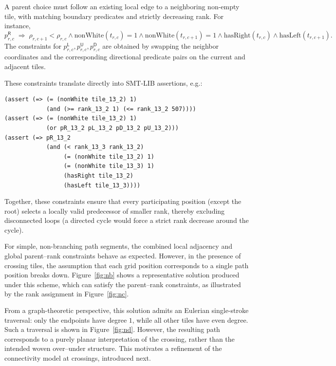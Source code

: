 \documentclass[acmsmall,screen,nonacm]{acmart}
\newcommand{\kind}[1]{\mathsf{#1}}
\begin{document}
A parent choice must follow an existing local edge to a neighboring
non-empty tile, with matching boundary predicates and strictly
decreasing rank. For instance,
\[
p^\kind{R}_{r,c}\;\Rightarrow\; \rho_{r,c+1}<\rho_{r,c} \wedge
\mathrm{nonWhite}(t_{r,c}) = 1 \wedge \mathrm{nonWhite}(t_{r,c+1})=1
\wedge \mathrm{hasRight}(t_{r,c}) \wedge \mathrm{hasLeft}(t_{r,c+1}) .
\]
The constraints for \(p^\kind{L}_{r,c}, p^\kind{U}_{r,c}, p^\kind{D}_{r,c}\) are
obtained by swapping the neighbor coordinates and the corresponding
directional predicate pairs on the current and adjacent tiles.

These constraints translate directly into SMT-LIB assertions, e.g.:
\begin{tcolorbox}[smtsimple]
\begin{verbatim}
(assert (=> (= (nonWhite tile_13_2) 1)
            (and (>= rank_13_2 1) (<= rank_13_2 507))))
(assert (=> (= (nonWhite tile_13_2) 1)
            (or pR_13_2 pL_13_2 pD_13_2 pU_13_2)))
(assert (=> pR_13_2
            (and (< rank_13_3 rank_13_2)
                 (= (nonWhite tile_13_2) 1)
                 (= (nonWhite tile_13_3) 1)
                 (hasRight tile_13_2)
                 (hasLeft tile_13_3))))
\end{verbatim}
\end{tcolorbox}

Together, these constraints ensure that every participating position
(except the root) selects a locally valid predecessor of smaller rank,
thereby excluding disconnected loops (a directed cycle would force a
strict rank decrease around the cycle).

For simple, non-branching path segments, the combined local adjacency
and global parent--rank constraints behave as expected. However, in
the presence of crossing tiles, the assumption that each grid position
corresponds to a single path position breaks down. Figure~\ref{fig:nb}
shows a representative solution produced under this scheme, which can
satisfy the parent--rank constraints, as illustrated by the rank
assignment in Figure~\ref{fig:nc}.

From a graph-theoretic perspective, this solution admits an Eulerian
single-stroke traversal: only the endpoints have degree \(1\), while
all other tiles have even degree. Such a traversal is shown in
Figure~\ref{fig:nd}. However, the resulting path corresponds to a
purely planar interpretation of the crossing, rather than the intended
woven over--under structure. This motivates a refinement of the
connectivity model at crossings, introduced next.
\end{document}
